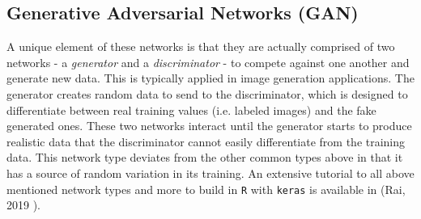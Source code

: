 
\subsection{Generative Adversarial Networks
(GAN)}\label{generative-adversarial-networks-gan}

A unique element of these networks is that they are actually comprised of two networks - a \textit{generator} and a \textit{discriminator} - to compete against one another and generate new data.  This is typically applied in image generation applications.  The generator creates random data to send to the discriminator, which is designed to differentiate between real training values (i.e. labeled images) and the fake generated ones.  These two networks interact until the generator starts to produce realistic data that the discriminator cannot easily differentiate from the training data.  This network type deviates from the other common types above in that it has a source of random variation in its training.  An extensive tutorial to all above mentioned network types and more to build in \texttt{R} with \texttt{keras} is available in (Rai, 2019 \cite{rai}).